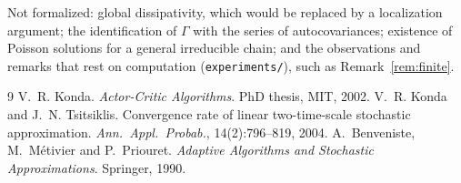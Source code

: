 \documentclass[11pt]{article}
\theoremstyle{definition}
\theoremstyle{remark}
\begin{document}
Not formalized: global dissipativity, which would be replaced by a localization argument; the
identification of $\Gamma$ with the series of autocovariances; existence of Poisson solutions for a
general irreducible chain; and the observations and remarks that rest on computation
(\texttt{experiments/}), such as Remark~\ref{rem:finite}.

\begin{thebibliography}{9}
 V.~R. Konda. \emph{Actor-Critic Algorithms}. PhD thesis, MIT, 2002.
 V.~R. Konda and J.~N. Tsitsiklis. Convergence rate of linear
  two-time-scale stochastic approximation. \emph{Ann.\ Appl.\ Probab.}, 14(2):796--819, 2004.
 A.~Benveniste, M.~M\'etivier and P.~Priouret. \emph{Adaptive Algorithms
  and Stochastic Approximations}. Springer, 1990.
\end{thebibliography}
\end{document}
